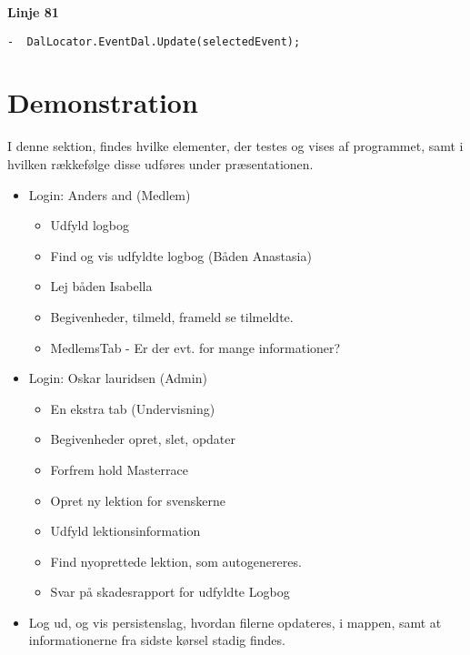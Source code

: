 \documentclass[article,a4paper,11pt,onseside,final]{memoir}
\begin{document}
\lstset{firstnumber=80}
\textbf{Linje 81}
\begin{lstlisting}[frame=single, label=fntpg-cb]
-  DalLocator.EventDal.Update(selectedEvent);
\end{lstlisting}

\newpage
\chapter{Demonstration}

I denne sektion, findes hvilke elementer, der testes og vises af programmet, samt i hvilken rækkefølge disse udføres under præsentationen.

\begin{itemize}
	\item Login: Anders and (Medlem)
		\begin{itemize}
			\item Udfyld logbog
			\item Find og vis udfyldte logbog (Båden Anastasia)
			\item Lej båden Isabella
			\item Begivenheder, tilmeld, frameld se tilmeldte.
			\item MedlemsTab - Er der evt. for mange informationer?
		\end{itemize}
	\item Login: Oskar lauridsen (Admin)
		\begin{itemize}
			\item En ekstra tab (Undervisning)
			\item Begivenheder opret, slet, opdater
			\item Forfrem hold Masterrace
			\item Opret ny lektion for svenskerne
			\item Udfyld lektionsinformation
			\item Find nyoprettede lektion, som autogenereres. 
			\item Svar på skadesrapport for udfyldte Logbog
		\end{itemize}
	\item Log ud, og vis persistenslag, hvordan filerne opdateres, i mappen, samt at informationerne fra sidste kørsel stadig findes.
\end{itemize}
\end{document}
